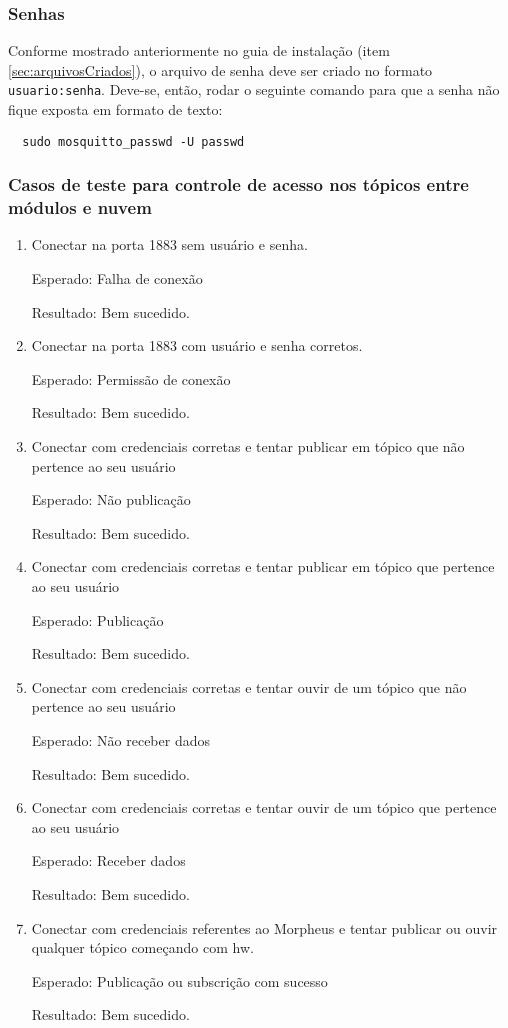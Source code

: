 \subsubsection{Senhas}

Conforme mostrado anteriormente no guia de instalação (item \ref{sec:arquivosCriados}), o arquivo de senha deve ser criado no formato \lstinline{usuario:senha}. Deve-se, então, rodar o seguinte comando para que a senha não fique exposta em formato de texto:

\begin{lstlisting}
  sudo mosquitto_passwd -U passwd
\end{lstlisting}

\subsubsection{Casos de teste para controle de acesso nos tópicos \wmqtt{} entre módulos e nuvem}
\begin{enumerate}
\item
Conectar na porta 1883 sem usuário e senha.

Esperado: Falha de conexão

Resultado: Bem sucedido.
\item Conectar na porta 1883 com usuário e senha corretos.

Esperado: Permissão de conexão

Resultado: Bem sucedido.
\item
Conectar com credenciais corretas e tentar publicar em tópico que não pertence ao seu usuário

Esperado: Não publicação

Resultado: Bem sucedido.
\item
Conectar com credenciais corretas e tentar publicar em tópico que pertence ao seu usuário

Esperado: Publicação

Resultado: Bem sucedido.
\item
Conectar com credenciais corretas e tentar ouvir de um tópico que não pertence ao seu usuário

Esperado: Não receber dados

Resultado: Bem sucedido.
\item
Conectar com credenciais corretas e tentar ouvir de um tópico que pertence ao seu usuário

Esperado: Receber dados

Resultado: Bem sucedido.

\item
Conectar com credenciais referentes ao Morpheus e tentar publicar ou ouvir qualquer tópico começando com hw.

Esperado: Publicação ou subscrição com sucesso

Resultado: Bem sucedido.
\end{enumerate}
